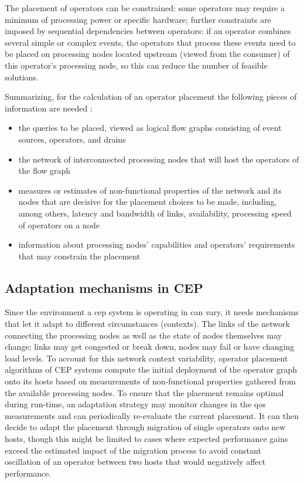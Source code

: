 The placement of operators can be constrained: some operators may require a minimum of processing power or specific hardware; further constraints are imposed by sequential dependencies between operators: if an operator combines several simple or complex events, the operators that process these events need to be placed on processing nodes located upstream (viewed from the consumer) of this operator's processing node, so this can reduce the number of feasible solutions. 

Summarizing, for the calculation of an operator placement the following pieces of information are needed \cite{Lakshmanan2008}:
\begin{itemize}
\item the queries to be placed, viewed as logical flow graphs consisting of event sources, operators, and drains
\item the network of interconnected processing nodes that will host the operators of the flow graph
\item measures or estimates of non-functional properties of the network and its nodes that are decisive for the placement choices  to be made, including, among others, latency and bandwidth of links, availability, processing speed of operators on a node 
\item information about processing nodes' capabilities and operators' requirements that may constrain the placement
\end{itemize}


\subsection{Adaptation mechanisms in CEP}
Since the environment a \gls{cep} system is operating in can vary, it needs mechanisms that let it adapt to different circumstances (contexts). The links of the network connecting the processing nodes as well as the state of nodes themselves may change; links may get congested or break down, nodes may fail or have changing load levels.
To account for this network context variability, operator placement algorithms of \gls{CEP} systems compute the initial deployment of the operator graph onto its hosts based on measurements of non-functional properties gathered from the available processing nodes. 
To ensure that the placement remains optimal during run-time, an adaptation strategy may monitor changes in the \gls{qos} measurements and can periodically re-evaluate the current placement. It can then decide to adapt the placement through migration of single operators onto new hosts, though this might be limited to cases where expected performance gains exceed the estimated impact of the migration process to avoid constant oscillation of an operator between two hosts that would negatively affect performance.

